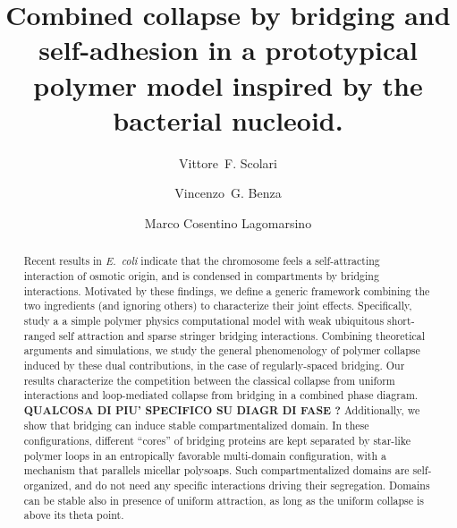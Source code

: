 \documentclass[
preprint,
a4paper,
12pt,
superscriptaddress,
pre]{revtex4}
\begin{document}
 

\title{Combined collapse by bridging and self-adhesion in a
  prototypical polymer model inspired by the bacterial nucleoid.}

\author{Vittore~F. Scolari}
%
%
%
% 
%
\author{Vincenzo~G. Benza}
%
%
\author{Marco Cosentino Lagomarsino}
%

\begin{abstract}
  Recent results in \emph{E.~coli} indicate that the chromosome feels
  a self-attracting interaction of osmotic origin, and is condensed in
  compartments by bridging interactions.
  Motivated by these findings, we define a generic framework combining
  the two ingredients (and ignoring others) to characterize their
  joint effects. Specifically, study a a simple polymer physics
  computational model with weak ubiquitous short-ranged self
  attraction and sparse stringer bridging interactions.  Combining
  theoretical arguments and simulations, we study the general
  phenomenology of polymer collapse induced by these dual
  contributions, in the case of regularly-spaced bridging.
%
  Our results characterize the competition between the classical
  collapse from uniform interactions and loop-mediated collapse from
  bridging in a combined phase diagram.
%
  \textbf{ QUALCOSA DI PIU' SPECIFICO SU DIAGR DI FASE ?}
%
  Additionally, we show that bridging can induce stable
  compartmentalized domain. In these configurations, different
  ``cores'' of bridging proteins are kept separated by star-like
  polymer loops in an entropically favorable multi-domain
  configuration, with a mechanism that parallels micellar polysoaps.
  Such compartmentalized domains are self-organized, and do not need
  any specific interactions driving their segregation.  Domains can be
  stable also in presence of uniform attraction, as long as the
  uniform collapse is above its theta point.
\end{abstract}
\end{document}
